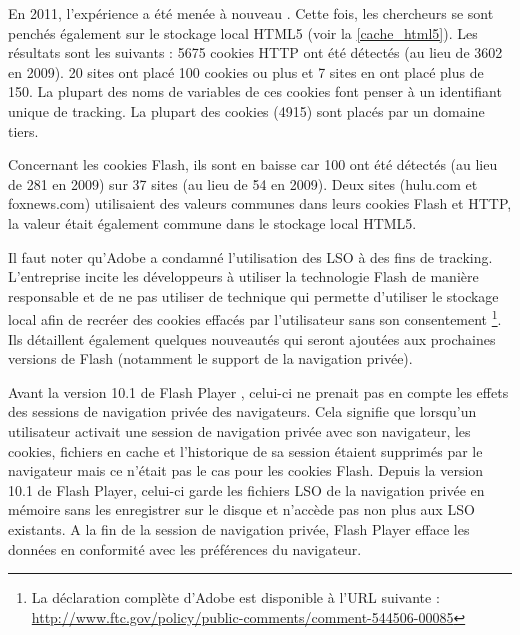 En 2011, l'expérience a été menée à nouveau \cite{flash_cookies_privacy_2}. Cette fois, les chercheurs se sont penchés également sur le stockage local HTML5 (voir la \autoref{cache_html5}). Les résultats sont les suivants : 5675 cookies HTTP ont été détectés (au lieu de 3602 en 2009). 20 sites ont placé 100 cookies ou plus et 7 sites en ont placé plus de 150. La plupart des noms de variables de ces cookies font penser à un identifiant unique de tracking. La plupart des cookies (4915) sont placés par un domaine tiers.

Concernant les cookies Flash, ils sont en baisse car 100 ont été détectés (au lieu de 281 en 2009) sur 37 sites (au lieu de 54 en 2009).
Deux sites (hulu.com et foxnews.com) utilisaient des valeurs communes dans leurs cookies Flash et HTTP, la valeur était également commune dans le stockage local HTML5.
\newline

Il faut noter qu'Adobe a condamné l'utilisation des LSO à des fins de tracking. L'entreprise incite les développeurs à utiliser la technologie Flash de manière responsable et de ne pas utiliser de technique qui permette d'utiliser le stockage local afin de recréer des cookies effacés par l'utilisateur sans son consentement \footnote{La déclaration complète d'Adobe est disponible à l'URL suivante : \url{http://www.ftc.gov/policy/public-comments/comment-544506-00085}}. Ils détaillent également quelques nouveautés qui seront ajoutées aux prochaines versions de Flash (notamment le support de la navigation privée).
\newline

Avant la version 10.1 de Flash Player \cite{flash_private}, celui-ci ne prenait pas en compte les effets des sessions de navigation privée des navigateurs. Cela signifie que lorsqu'un utilisateur activait une session de navigation privée avec son navigateur, les cookies, fichiers en cache et l'historique de sa session étaient supprimés par le navigateur mais ce n'était pas le cas pour les cookies Flash. Depuis la version 10.1 de Flash Player, celui-ci garde les fichiers LSO de la navigation privée en mémoire sans les enregistrer sur le disque et n'accède pas non plus aux LSO existants. A la fin de la session de navigation privée, Flash Player efface les données en conformité avec les préférences du navigateur.

